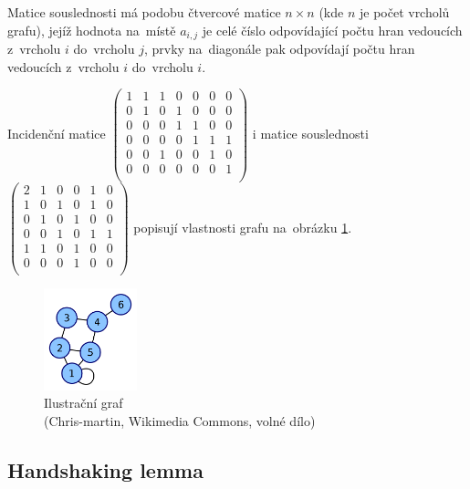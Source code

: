 Matice souslednosti má podobu čtvercové matice $n \times n$ (kde $n$ je počet vrcholů grafu), jejíž hodnota na~místě $a_{i,j}$ je celé číslo odpovídající počtu hran vedoucích z~vrcholu $i$ do~vrcholu $j$, prvky na~diagonále pak odpovídají počtu hran vedoucích z~vrcholu $i$ do~vrcholu $i$.

Incidenční matice
$\left( \begin{matrix}
1 & 1 & 1 & 0 & 0 & 0 & 0 \\
0 & 1 & 0 & 1 & 0 & 0 & 0 \\
0 & 0 & 0 & 1 & 1 & 0 & 0 \\
0 & 0 & 0 & 0 & 1 & 1 & 1 \\
0 & 0 & 1 & 0 & 0 & 1 & 0 \\
0 & 0 & 0 & 0 & 0 & 0 & 1 \\
\end{matrix} \right)$ 
i matice souslednosti
$\left( \begin{matrix}
2 & 1 & 0 & 0 & 1 & 0 \\
1 & 0 & 1 & 0 & 1 & 0 \\
0 & 1 & 0 & 1 & 0 & 0 \\
0 & 0 & 1 & 0 & 1 & 1 \\
1 & 1 & 0 & 1 & 0 & 0 \\
0 & 0 & 0 & 1 & 0 & 0 \\
\end{matrix} \right)$
popisují vlastnosti grafu na~obrázku \ref{ilustracni-graf-matice}.

\begin{figure}[ht]
\centering
\includegraphics[height=8em]{images/3_graf-matice-souslednosti}

\caption[Ilustrační graf]{Ilustrační graf\\{\small (Chris-martin, Wikimedia Commons, volné dílo)}}
\label{ilustracni-graf-matice}
\end{figure}

\subsection{Handshaking lemma}

